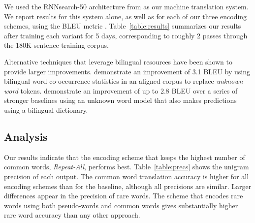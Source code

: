 We used the RNNsearch-50 architecture from 
as our machine translation system. We report results for this system alone, as
well as for each of our three encoding schemes, using the BLEU metric
\cite{bleu}. Table~\ref{table:results} summarizes our results after training
each variant for 5 days, corresponding to roughly 2 passes through the
180K-sentence training corpus.

Alternative techniques that leverage bilingual resources have been shown to
provide larger improvements.  demonstrate an
improvement of 3.1 BLEU by using bilingual word co-occurrence statistics in an
aligned corpus to replace \emph{unknown word} tokens.
 demonstrate an improvement of up to 2.8
BLEU over a series of stronger baselines using an unknown word model that
also makes predictions using a bilingual dictionary.

\subsection{Analysis}

\begin{table}
  \centering
  \vspace{8pt}
  \caption{Test set precision (\%) on common words and rare words for each
  encoding strategy. \emph{1st Symbol} denotes the precision of the first
  pseudo-word symbol in an encoded rare word.}
  \label{table:precs}
\end{table}

Our results indicate that the encoding scheme that keeps the highest number of
common words, \emph{Repeat-All}, performs best. Table~\ref{table:precs} shows
the unigram precision of each output. The common word translation accuracy is
higher for all encoding schemes than for the baseline, although all precisions
are similar. Larger differences appear in the precision of rare words. The
scheme that encodes rare words using both pseudo-words and common words gives
substantially higher rare word accuracy than any other approach.

